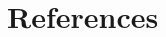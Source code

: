 \documentclass[final,3p,times,authoryear]{elsarticle}
\begin{document}

\section*{References}\label{sec:ref}
   
  


\begin{thebibliography}{00}


\bibitem[ ()]{}

\end{thebibliography}









%
\end{document}
